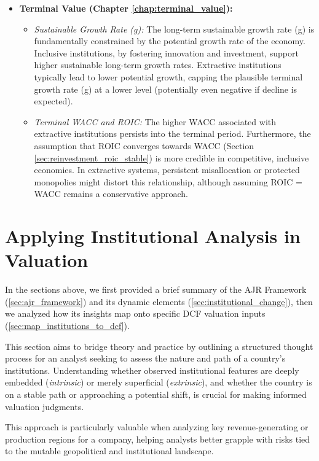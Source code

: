 \begin{itemize}
    \item \textbf{Terminal Value (Chapter \ref{chap:terminal_value}):}
          \begin{itemize}
              \item \textit{Sustainable Growth Rate (g):} The long-term sustainable growth rate (g) is fundamentally constrained by the potential growth rate of the economy. Inclusive institutions, by fostering innovation and investment, support higher sustainable long-term growth rates. Extractive institutions typically lead to lower potential growth, capping the plausible terminal growth rate (g) at a lower level (potentially even negative if decline is expected).
              \item \textit{Terminal WACC and ROIC:} The higher WACC associated with extractive institutions persists into the terminal period. Furthermore, the assumption that ROIC converges towards WACC (Section \ref{sec:reinvestment_roic_stable}) is more credible in competitive, inclusive economies. In extractive systems, persistent misallocation or protected monopolies might distort this relationship, although assuming ROIC = WACC remains a conservative approach.
          \end{itemize}
\end{itemize}

\section{Applying Institutional Analysis in Valuation}
\label{sec:applying_institutional_analysis}

In the sections above, we first provided a brief summary of the AJR Framework (\ref{sec:ajr_framework}) and its dynamic elements (\ref{sec:institutional_change}), then we analyzed how its insights map onto specific DCF valuation inputs (\ref{sec:map_institutions_to_dcf}).

This section aims to bridge theory and practice by outlining a structured thought process for an analyst seeking to assess the nature and path of a country's institutions. Understanding whether observed institutional features are deeply embedded (\textit{intrinsic}) or merely superficial (\textit{extrinsic}), and whether the country is on a stable path or approaching a potential shift, is crucial for making informed valuation judgments. 

This approach is particularly valuable when analyzing key revenue-generating or production regions for a company, helping analysts better grapple with risks tied to the mutable geopolitical and institutional landscape.

